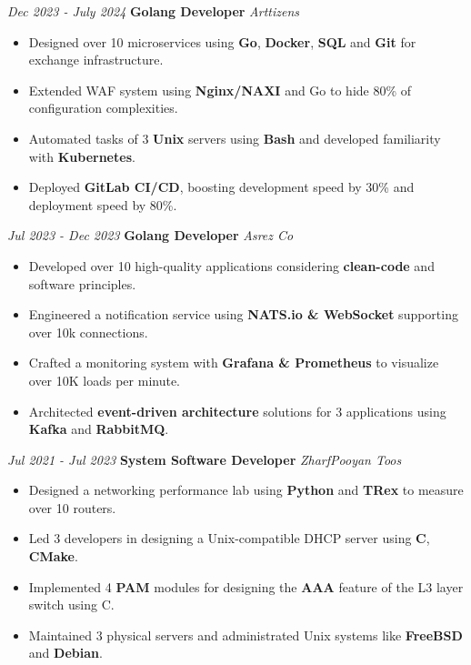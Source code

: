 \documentclass{engineercv}
\begin{document}
\begin{twocolentry}{\textit{Dec 2023 - July 2024}}
  \textbf{Golang Developer}
  \textit{Arttizens}
\end{twocolentry}

\begin{itemize}
  \item Designed over 10 microservices using \textbf{Go}, \textbf{Docker}, \textbf{SQL} and \textbf{Git} for exchange infrastructure.
  \item Extended WAF system using \textbf{Nginx/NAXI} and Go to hide 80\% of configuration complexities.
  \item Automated tasks of 3 \textbf{Unix} servers using \textbf{Bash} and developed familiarity with \textbf{Kubernetes}.
  \item Deployed \textbf{GitLab CI/CD}, boosting development speed by 30\% and deployment speed by 80\%.
\end{itemize}

\begin{twocolentry}{\textit{Jul 2023 - Dec 2023}}
  \textbf{Golang Developer}
  \textit{Asrez Co}
\end{twocolentry}

\begin{itemize}
  \item Developed over 10 high-quality applications considering \textbf{clean-code} and software principles.
  \item Engineered a notification service using \textbf{NATS.io \& WebSocket} supporting over 10k connections.
  \item Crafted a monitoring system with \textbf{Grafana \& Prometheus} to visualize over 10K loads per minute.
  \item Architected \textbf{event-driven architecture} solutions for 3 applications using \textbf{Kafka} and \textbf{RabbitMQ}.
\end{itemize}

\begin{twocolentry}{\textit{Jul 2021 - Jul 2023}}
  \textbf{System Software Developer}
  \textit{ZharfPooyan Toos}
\end{twocolentry}

\begin{itemize}
  \item Designed a networking performance lab using \textbf{Python} and \textbf{TRex} to measure over 10 routers.
  \item Led 3 developers in designing a Unix-compatible DHCP server using \textbf{C}, \textbf{CMake}.
  \item Implemented 4 \textbf{PAM} modules for designing the \textbf{AAA} feature of the L3 layer switch using C.
  \item Maintained 3 physical servers and administrated Unix systems like \textbf{FreeBSD} and \textbf{Debian}.
\end{itemize}
\end{document}
